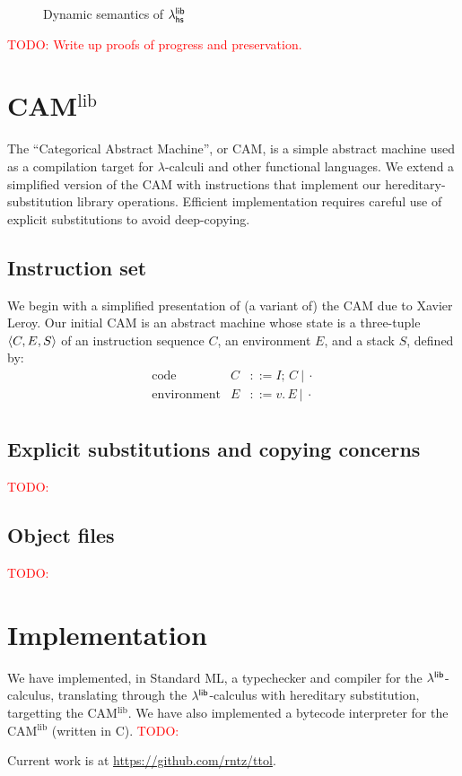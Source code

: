\documentclass[11pt]{article}
\newcommand{\todo}[1]{\textcolor{red}{\small TODO: #1}}
\begin{document}
\begin{figure}
  \caption{Dynamic semantics of $\lambda^{\textsf{lib}}_{\textsf{hs}}$}
  \label{fig:llhsdynsem}
\end{figure}

\todo{Write up proofs of progress and preservation.}


\newcommand{\camlib}{CAM\ensuremath{^{\text{lib}}}}
\section{\camlib{}}

The ``Categorical Abstract Machine'', or CAM\cite{cam87}, is a simple abstract
machine used as a compilation target for $\lambda$-calculi and other functional
languages. We extend a simplified version of the CAM with instructions that
implement our hereditary-substitution library operations. Efficient
implementation requires careful use of explicit substitutions to avoid
deep-copying.

\subsection{Instruction set}

\newcommand{\semi}{;\,}
\newcommand{\cons}[2]{{#1}.\,{#2}}
\newcommand{\nil}{\cdot}

We begin with a simplified presentation of (a variant of) the CAM due to Xavier
Leroy\cite{leroyzam05}. Our initial CAM is an abstract machine whose state is a
three-tuple $\left\langle C,E,S\right\rangle$ of an instruction sequence $C$, an environment $E$, and
a stack $S$, defined by:
\[\begin{array}{rrcl}
  \text{code} & C &::= I\semi C ~|~ \nil\\
  \text{environment} & E &::= \cons{v}{E} ~|~ \nil\\
\end{array}\]

\subsection{Explicit substitutions and copying concerns}
\todo{}

\subsection{Object files}
\todo{}


\section{Implementation}

We have implemented, in Standard ML, a typechecker and compiler for the
$\lambda^{\textsf{lib}}$-calculus, translating through the $\lambda^{\textsf{lib}}$-calculus with hereditary
substitution, targetting the \camlib{}. We have also implemented a bytecode
interpreter for the \camlib{} (written in C). \todo{}

Current work is at \url{https://github.com/rntz/ttol}.


\newpage


\end{document}
